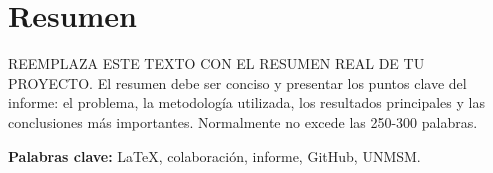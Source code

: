 \chapter*{Resumen}

REEMPLAZA ESTE TEXTO CON EL RESUMEN REAL DE TU PROYECTO.
El resumen debe ser conciso y presentar los puntos clave del informe: el problema, la metodología utilizada, los resultados principales y las conclusiones más importantes. Normalmente no excede las 250-300 palabras.

\vspace{1cm}
\noindent
\textbf{Palabras clave:} LaTeX, colaboración, informe, GitHub, UNMSM.